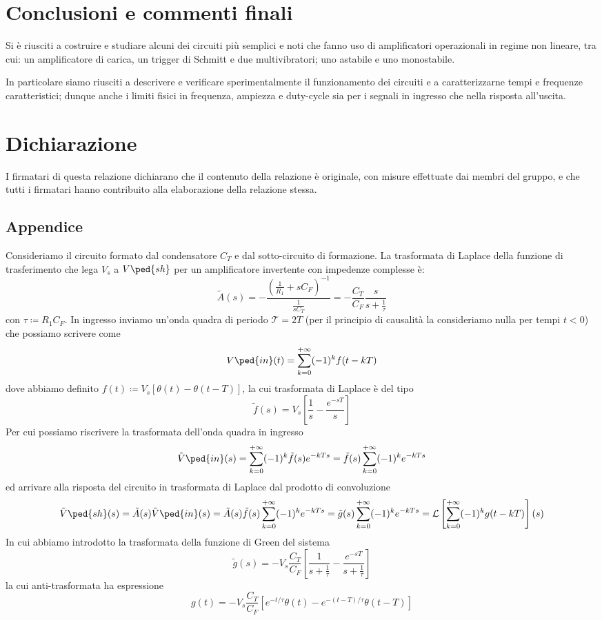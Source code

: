 \documentclass[10pt, a4paper, italian]{article}
\begin{document}
\section*{Conclusioni e commenti finali}
Si è riusciti a costruire e studiare alcuni dei circuiti più semplici e noti
che fanno uso di amplificatori operazionali in regime non lineare, tra cui:
un amplificatore di carica, un trigger di Schmitt e due multivibratori; uno
astabile e uno monostabile.

In particolare siamo riusciti a descrivere e verificare sperimentalmente il
funzionamento dei circuiti e a caratterizzarne tempi e frequenze
caratteristici; dunque anche i limiti fisici in frequenza, ampiezza e
duty-cycle sia per i segnali in ingresso che nella risposta all'uscita.

\section*{Dichiarazione}
I firmatari di questa relazione dichiarano che il contenuto della relazione \`e
originale, con misure effettuate dai membri del gruppo, e che tutti i firmatari
hanno contribuito alla elaborazione della relazione stessa.

\newpage
\appendix
\subsection*{Appendice}\label{sec: appendix}
Consideriamo il circuito formato dal condensatore $C_T$ e dal sotto-circuito
di formazione. La trasformata di Laplace della funzione di trasferimento che
lega $V_s$ a $V\ped{sh}$ per un amplificatore invertente con impedenze
complesse è:
\[
\tilde{A}(s) =
- \frac{\left(\frac{1}{R_1} + s C_F\right)^{-1}}{\frac{1}{s C_T}} =
- \frac{C_T}{C_F} \frac{s}{s + \frac{1}{\tau}}
\]
con $\tau \coloneqq R_1 C_F$. In ingresso inviamo un'onda quadra di periodo
$\mathcal{T} = 2T$ (per il principio di causalità la consideriamo nulla per
tempi $t < 0$) che possiamo scrivere come
\[
V\ped{in}(t) = \sum_{k=0}^{+\infty} (-1)^kf(t - kT)
\]
dove abbiamo definito $f(t) \coloneqq V_s \left[\theta(t) -
\theta(t - T)\right]$, la cui trasformata di Laplace è del tipo
\[
\tilde{f}(s) = V_s\left[\frac{1}{s} - \frac{e^{-sT}}{s}\right]
\]
Per cui possiamo riscrivere la trasformata dell'onda quadra in ingresso
\[
\tilde{V}\ped{in}(s) = \sum_{k=0}^{+\infty} (-1)^k \tilde{f}(s) e^{-kTs} = 
\tilde{f}(s) \sum_{k=0}^{+\infty} (-1)^k e^{-kTs}
\]
ed arrivare alla risposta del circuito in trasformata di Laplace dal
prodotto di convoluzione
\[
\tilde{V}\ped{sh}(s) = \tilde{A}(s) \tilde{V}\ped{in}(s) =  
\tilde{A}(s)\tilde{f}(s) \sum_{k=0}^{+\infty} (-1)^ke^{-kTs} =
\tilde{g}(s) \sum_{k=0}^{+\infty} (-1)^ke^{-kTs} =
\mathcal{L}\left[\sum_{k=0}^{+\infty} (-1)^kg(t - kT)\right](s)
\]
In cui abbiamo introdotto la trasformata della funzione di Green del sistema
\[
\tilde{g}(s) = - V_s \frac{C_T}{C_F} \left[\frac{1}{s + \frac{1}{\tau}} -
\frac{e^{-sT}}{s + \frac{1}{\tau}}\right]
\]
la cui anti-trasformata ha espressione
\[
g(t) = - V_s \frac{C_T}{C_F} \left[e^{-t/\tau}\theta(t) - 
e^{-(t-T)/\tau} \theta(t - T) \right]
\]
\end{document}
